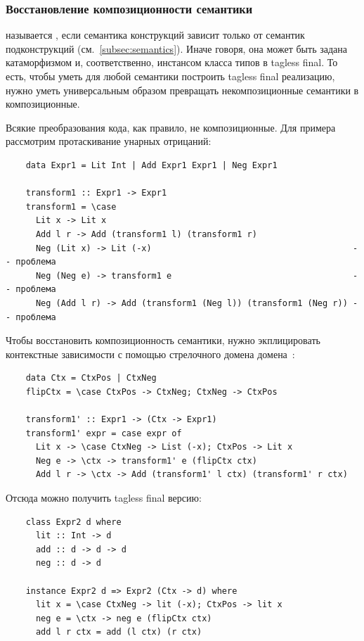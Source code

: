 \subsubsection{Восстановление композиционности семантики} \label{subsubsec:recover-compositionality}

 называется , если семантика конструкций зависит только от семантик подконструкций (см.~\ref{subsec:semantics}).
Иначе говоря, она может быть задана катаморфизмом и, соответственно, инстансом класса типов в tagless final.
То есть, чтобы уметь для любой семантики построить tagless final реализацию, нужно уметь универсальным образом превращать некомпозиционные семантики в композиционные.

Всякие преобразования кода, как правило, не композиционные.
Для примера рассмотрим протаскивание унарных отрицаний:
\begin{verbatim}
    data Expr1 = Lit Int | Add Expr1 Expr1 | Neg Expr1

    transform1 :: Expr1 -> Expr1
    transform1 = \case
      Lit x -> Lit x
      Add l r -> Add (transform1 l) (transform1 r)
      Neg (Lit x) -> Lit (-x)                                        -- проблема
      Neg (Neg e) -> transform1 e                                    -- проблема
      Neg (Add l r) -> Add (transform1 (Neg l)) (transform1 (Neg r)) -- проблема
\end{verbatim}
Чтобы восстановить композиционность семантики, нужно экплицировать контекстные зависимости с помощью стрелочного домена домена~\cite{kiselyov2012typed}:
\begin{verbatim}
    data Ctx = CtxPos | CtxNeg
    flipCtx = \case CtxPos -> CtxNeg; CtxNeg -> CtxPos

    transform1' :: Expr1 -> (Ctx -> Expr1)
    transform1' expr = case expr of
      Lit x -> \case CtxNeg -> List (-x); CtxPos -> Lit x
      Neg e -> \ctx -> transform1' e (flipCtx ctx)
      Add l r -> \ctx -> Add (transform1' l ctx) (transform1' r ctx)
\end{verbatim}
Отсюда можно получить tagless final версию:
\begin{verbatim}
    class Expr2 d where
      lit :: Int -> d
      add :: d -> d -> d
      neg :: d -> d

    instance Expr2 d => Expr2 (Ctx -> d) where
      lit x = \case CtxNeg -> lit (-x); CtxPos -> lit x
      neg e = \ctx -> neg e (flipCtx ctx)
      add l r ctx = add (l ctx) (r ctx)
\end{verbatim}

